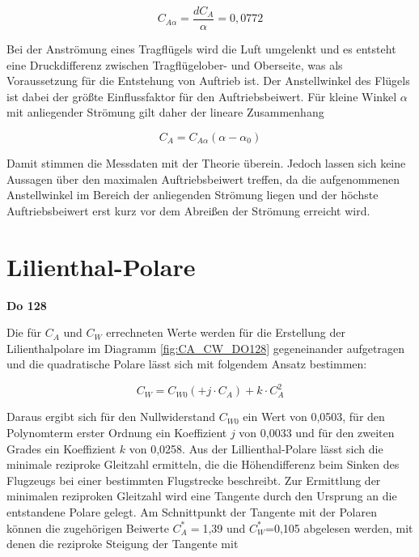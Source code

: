 \begin{equation}
C_{A\alpha}=\frac{dC_A}{\alpha}=0,0772
\end{equation}

	
Bei der Anströmung eines Tragflügels wird die Luft umgelenkt und es entsteht eine Druckdifferenz zwischen Tragflügelober- und Oberseite, was als Voraussetzung für die Entstehung von Auftrieb ist. Der Anstellwinkel des Flügels ist dabei der größte Einflussfaktor für den Auftriebsbeiwert. Für kleine Winkel $\alpha$ mit anliegender Strömung gilt daher der lineare Zusammenhang \cite{Skript}

\begin{equation}
C_A=C_{A\alpha} \left(\alpha - \alpha_0\right)
\end{equation}

Damit stimmen die Messdaten mit der Theorie überein. Jedoch lassen sich keine Aussagen über den maximalen Auftriebsbeiwert treffen, da die aufgenommenen Anstellwinkel im Bereich der anliegenden Strömung liegen und der höchste Auftriebsbeiwert erst kurz vor dem Abreißen der Strömung erreicht wird. 

\section{Lilienthal-Polare}

\textbf{Do 128}

Die für $C_A$ und $C_W$ errechneten Werte werden für die Erstellung der Lilienthalpolare im Diagramm \ref{fig:CA_CW_DO128} gegeneinander aufgetragen und die quadratische Polare lässt sich mit folgendem Ansatz \cite{Skript} bestimmen:

\begin{equation}
C_W = C_{W0} (+ j \cdot C_A) + k \cdot C_{A}^2
\end{equation}

 Daraus ergibt sich für den Nullwiderstand $C_{W0}$ ein Wert von 0,0503, für den Polynomterm erster Ordnung ein Koeffizient $j$ von 0,0033 und für den zweiten Grades ein Koeffizient $k$ von 0,0258. 
Aus der Lillienthal-Polare lässt sich die minimale reziproke Gleitzahl ermitteln, die die Höhendifferenz beim Sinken des Flugzeugs bei einer bestimmten Flugstrecke beschreibt. Zur Ermittlung der minimalen reziproken Gleitzahl wird eine Tangente durch den Ursprung an die entstandene Polare gelegt. Am Schnittpunkt der Tangente mit der Polaren können die zugehörigen Beiwerte $C_A^*=$1,39 und  $C_W^*$=0,105 abgelesen werden, mit denen die reziproke Steigung der Tangente mit

